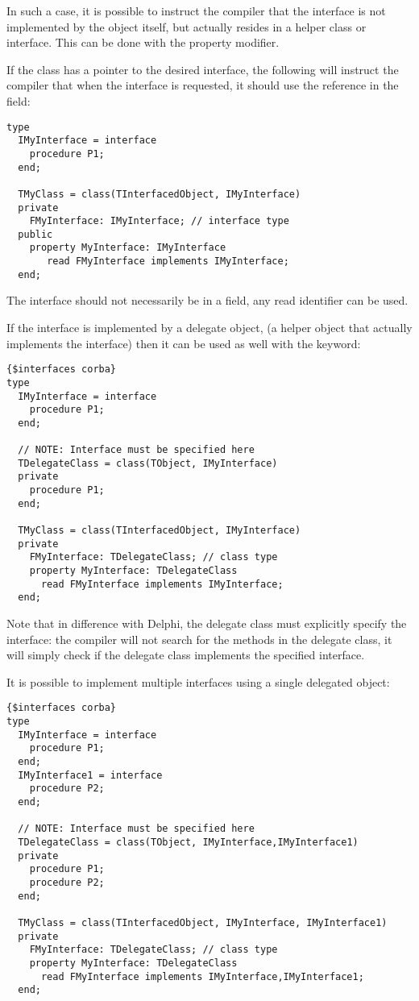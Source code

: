 In such a case, it is possible to instruct the compiler that the interface
is not implemented by the object itself, but actually resides in a helper
class or interface. This can be done with the  property modifier.

If the class has a pointer to the desired interface, the following will
instruct the compiler that when the  interface is
requested, it should use the reference in the field:
\begin{verbatim}
type
  IMyInterface = interface
    procedure P1;
  end;

  TMyClass = class(TInterfacedObject, IMyInterface)
  private
    FMyInterface: IMyInterface; // interface type
  public
    property MyInterface: IMyInterface
       read FMyInterface implements IMyInterface;
  end;
\end{verbatim}
The interface should not necessarily be in a field, any read identifier can
be used.

If the interface is implemented by a delegate object, (a helper object that
actually implements the interface) then it can be used as well with the
 keyword:
\begin{verbatim}
{$interfaces corba}
type
  IMyInterface = interface
    procedure P1;
  end;

  // NOTE: Interface must be specified here
  TDelegateClass = class(TObject, IMyInterface)
  private
    procedure P1;
  end;

  TMyClass = class(TInterfacedObject, IMyInterface)
  private
    FMyInterface: TDelegateClass; // class type
    property MyInterface: TDelegateClass
      read FMyInterface implements IMyInterface;
  end;
\end{verbatim}
Note that in difference with Delphi, the delegate class must explicitly
specify the interface: the compiler will not search for the methods in the
delegate class, it will simply check if the delegate class implements the
specified interface.

It is possible to implement multiple interfaces using a single delegated
object:
\begin{verbatim}
{$interfaces corba}
type
  IMyInterface = interface
    procedure P1;
  end;
  IMyInterface1 = interface
    procedure P2;
  end;

  // NOTE: Interface must be specified here
  TDelegateClass = class(TObject, IMyInterface,IMyInterface1)
  private
    procedure P1;
    procedure P2;
  end;

  TMyClass = class(TInterfacedObject, IMyInterface, IMyInterface1)
  private
    FMyInterface: TDelegateClass; // class type
    property MyInterface: TDelegateClass
      read FMyInterface implements IMyInterface,IMyInterface1;
  end;
\end{verbatim}

